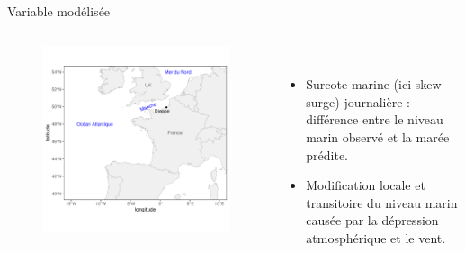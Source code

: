 \documentclass[aspectratio=169]{beamer}
\begin{document}
\begin{frame}{Variable modélisée}
\begin{columns}
	\begin{column}{0.65\textwidth}
	\vspace{-1.2cm}
	\begin{figure}
	 		\includegraphics[height=1.1\textheight, center]{../figures/map.pdf}
	\end{figure}
	\end{column}
	\begin{column}{0.35\textwidth}
	\vspace{-1cm}\\
	\begin{itemize}
	\setlength{\itemsep}{17pt}
	\item Surcote marine (ici skew surge) journalière : différence entre le niveau marin observé et la marée prédite.
	\item Modification locale et transitoire du niveau marin causée par la dépression atmosphérique et le vent.
	\end{itemize}
	\end{column}
\end{columns}
\end{frame}
\end{document}
